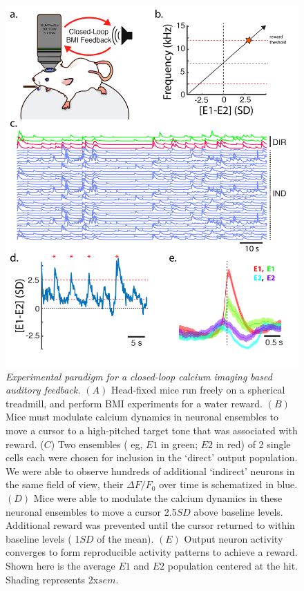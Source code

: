 \documentclass[letterpaper, 10 pt, conference]{ieeeconf}  %
\begin{document}
  \begin{figure}[thpb]
      \centering
      \includegraphics[scale=.38]{figures/figure01.png}
      \caption{\emph{Experimental paradigm for a closed-loop calcium imaging based auditory feedback.} $(A)$ Head-fixed mice run freely on a spherical treadmill, and perform BMI experiments for a water reward.  $(B)$  Mice must modulate calcium dynamics in neuronal ensembles to move a cursor to a high-pitched target tone that was associated with reward. ($C$) Two ensembles ( eg, $E1$ in green; $E2$ in red) of 2 single cells each were chosen for inclusion in the `direct' output population. We were able to observe hundreds of additional `indirect' neurons in the same field of view, their $\Delta F/F_{0}$ over time is schematized in blue. $(D)$  Mice were able to modulate the calcium dynamics in these neuronal ensembles to move a cursor 2.5$SD$ above baseline levels. Additional reward was prevented until the cursor returned to within baseline levels ( 1$SD$ of the mean). $(E)$  Output neuron activity converges to form reproducible activity patterns to achieve a reward. Shown here is the average $E1$ and $E2$ population centered at the hit. Shading represents  2x$sem$. }
      \label{figurelabel}
   \end{figure}
\end{document}
